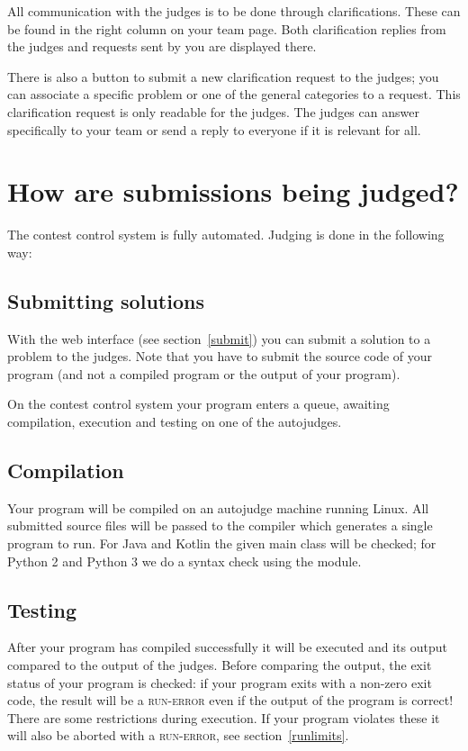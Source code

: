 All communication with the judges is to be done through clarifications.
These can be found in the right column on your team page. Both
clarification replies from the judges and requests sent by you
are displayed there.

There is also a button to submit a new clarification request to the
judges; you can associate a specific problem or one of the general
categories to a request. This clarification request is only readable
for the judges. The judges can answer specifically to your team or send a
reply to everyone if it is relevant for all.

\section{How are submissions being judged?}\label{howjudged}

The \DOMjudge contest control system is fully automated.
Judging is done in the following way:

\subsection{Submitting solutions}

With%
the web interface (see section~\ref{submit}) you can submit a solution
to a problem to the judges. Note that you have to submit the source code
of your program (and not a compiled program or the output of your
program).

On the contest control system your program enters a queue, awaiting compilation,
execution and testing on one of the autojudges.

\subsection{Compilation}

Your program will be compiled on an autojudge machine running Linux.
All submitted source files will be passed to the compiler which
generates a single program to run. For Java and Kotlin the given
main class will be checked; for Python 2 and Python 3 we do a
syntax check using the  module.

\subsection{Testing}\label{testing}

After your program has compiled successfully it will be executed and
its output compared to the output of the judges. Before comparing the
output, the exit status of your program is checked: if your program
exits with a non-zero exit code, the result will be a \textsc{run-error}
even if the output of the program is correct!
There are some restrictions during execution. If your program violates
these it will also be aborted with a \textsc{run-error},
see section~\ref{runlimits}.

